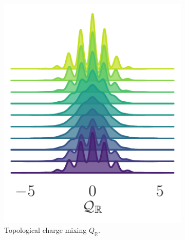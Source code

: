 \documentclass[a4paper,11pt]{article}
\begin{document}
\begin{figure}[htpb]
\begin{subfigure}[t]{0.32\textwidth}
        \includegraphics[width=\textwidth]{assets/ridgeplots/sinQf.pdf}
        \caption{\label{fig:sinQf_ridgeplot}Topological charge mixing
        \(Q_{\mathbb{R}}\).}
    \end{subfigure}
    \hfill
    \begin{subfigure}[t]{0.318\textwidth}

\end{subfigure}
\end{figure}
\end{document}
